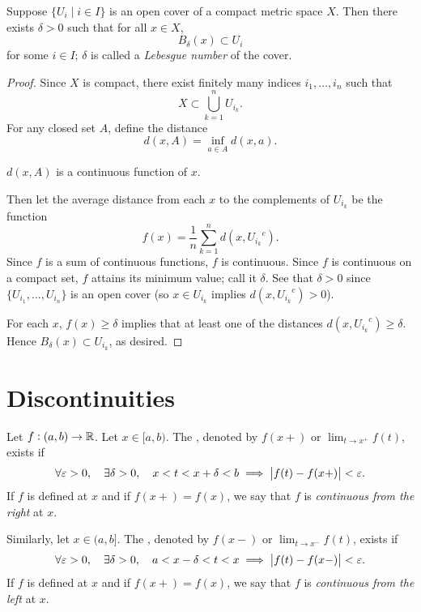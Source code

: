 \begin{lemma}
Suppose $\{U_i\mid i\in I\}$ is an open cover of a compact metric space $X$. Then there exists $\delta>0$ such that for all $x\in X$,
\[B_\delta(x)\subset U_i\]
for some $i\in I$; $\delta$ is called a \emph{Lebesgue number} of the cover.
\end{lemma}

\begin{proof}
Since $X$ is compact, there exist finitely many indices $i_1,\dots,i_n$ such that
\[X\subset\bigcup_{k=1}^{n}U_{i_k}.\]
For any closed set $A$, define the distance
\[d(x,A)=\inf_{a\in A}d(x,a).\]
\begin{claim}
$d(x,A)$ is a continuous function of $x$.
\end{claim}

Then let the average distance from each $x$ to the complements of $U_{i_k}$ be the function
\[f(x)=\frac{1}{n}\sum_{k=1}^{n}d(x,{U_{i_k}}^c).\]
Since $f$ is a sum of continuous functions, $f$ is continuous. Since $f$ is continuous on a compact set, $f$ attains its minimum value; call it $\delta$. See that $\delta>0$ since $\{U_{i_1},\dots,U_{i_n}\}$ is an open cover (so $x\in U_{i_k}$ implies $d(x,{U_{i_k}}^c)>0$).

For each $x$, $f(x)\ge\delta$ implies that at least one of the distances $d(x,{U_{i_k}}^c)\ge\delta$. Hence $B_\delta(x)\subset U_{i_k}$, as desired.
\end{proof}
\pagebreak

\section{Discontinuities}
\begin{definition}
Let $f:(a,b)\to\mathbb R$. Let $x\in[a,b)$. The , denoted by $f(x+)$ or $\displaystyle\lim_{t\to x^+}f(t)$, exists if
\[\forall\varepsilon>0,\quad\exists\delta>0,\quad x<t<x+\delta<b\implies\left|f(t)-f(x+)\right|<\varepsilon.\]
If $f$ is defined at $x$ and if $f(x+)=f(x)$, we say that $f$ is \emph{continuous from the right} at $x$.

Similarly, let $x\in(a,b]$. The , denoted by $f(x-)$ or $\displaystyle\lim_{t\to x^-}f(t)$, exists if
\[\forall\varepsilon>0,\quad\exists\delta>0,\quad a<x-\delta<t<x\implies\left|f(t)-f(x-)\right|<\varepsilon.\]
If $f$ is defined at $x$ and if $f(x+)=f(x)$, we say that $f$ is \emph{continuous from the left} at $x$.
\end{definition}

